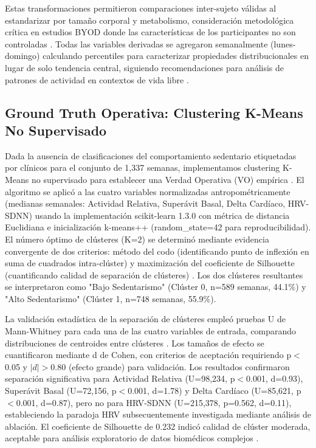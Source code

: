 Estas transformaciones permitieron comparaciones inter-sujeto válidas al estandarizar por tamaño corporal y metabolismo, consideración metodológica crítica en estudios BYOD donde las características de los participantes no son controladas \cite{Guyon2003}. Todas las variables derivadas se agregaron semanalmente (lunes-domingo) calculando percentiles para caracterizar propiedades distribucionales en lugar de solo tendencia central, siguiendo recomendaciones para análisis de patrones de actividad en contextos de vida libre \cite{Dumuid2018}.

\subsection{Ground Truth Operativa: Clustering K-Means No Supervisado}
\label{subsec:clustering}

Dada la ausencia de clasificaciones del comportamiento sedentario etiquetadas por clínicos para el conjunto de 1,337 semanas, implementamos clustering K-Means no supervisado para establecer una Verdad Operativa (VO) empírica \cite{Jain2010}. El algoritmo se aplicó a las cuatro variables normalizadas antropométricamente (medianas semanales: Actividad Relativa, Superávit Basal, Delta Cardíaco, HRV-SDNN) usando la implementación scikit-learn 1.3.0 con métrica de distancia Euclidiana e inicialización k-means++ (random\_state=42 para reproducibilidad). El número óptimo de clústeres (K=2) se determinó mediante evidencia convergente de dos criterios: método del codo (identificando punto de inflexión en suma de cuadrados intra-clúster) y maximización del coeficiente de Silhouette (cuantificando calidad de separación de clústeres) \cite{Rousseeuw1987}. Los dos clústeres resultantes se interpretaron como "Bajo Sedentarismo" (Clúster 0, n=589 semanas, 44.1\%) y "Alto Sedentarismo" (Clúster 1, n=748 semanas, 55.9\%).

La validación estadística de la separación de clústeres empleó pruebas U de Mann-Whitney para cada una de las cuatro variables de entrada, comparando distribuciones de centroides entre clústeres \cite{Mann1947}. Los tamaños de efecto se cuantificaron mediante d de Cohen, con criterios de aceptación requiriendo p$<$0.05 y $|d| > 0.80$ (efecto grande) para validación. Los resultados confirmaron separación significativa para Actividad Relativa (U=98,234, p$<$0.001, d=0.93), Superávit Basal (U=72,156, p$<$0.001, d=1.78) y Delta Cardíaco (U=85,621, p$<$0.001, d=0.87), pero no para HRV-SDNN (U=215,378, p=0.562, d=0.11), estableciendo la paradoja HRV subsecuentemente investigada mediante análisis de ablación. El coeficiente de Silhouette de 0.232 indicó calidad de clúster moderada, aceptable para análisis exploratorio de datos biomédicos complejos \cite{Kaufman2005}.

